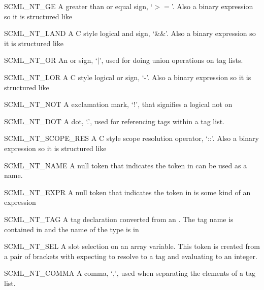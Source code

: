 \begin{cidentifierlist}
  \item[SCML_NT_GE]
  A greater than or equal sign, `$>=$'.  Also a binary expression so it is
  structured like 

  \item[SCML_NT_LAND]
  A C style logical and sign, `\&\&'.  Also a binary expression so it is
  structured like 

  \item[SCML_NT_OR]
  An or sign, `$|$', used for doing union operations on tag lists.

  \item[SCML_NT_LOR]
  A C style logical or sign, `-'.  Also a binary expression so it is structured
  like 

  \item[SCML_NT_NOT]
  A exclamation mark, `!', that signifies a logical not on

  \item[SCML_NT_DOT]
  A dot, `.', used for referencing tags within a tag list.

  \item[SCML_NT_SCOPE_RES]
  A C style scope resolution operator, `::'.  Also a binary expression so it is
  structured like 

  \item[SCML_NT_NAME]
  A null token that indicates the token in  can be
  used as a name.

  \item[SCML_NT_EXPR]
  A null token that indicates the token in  is some
  kind of an expression

  \item[SCML_NT_TAG]
  A tag declaration converted from an .  The tag
  name is contained in  and the name of the type is in

  \item[SCML_NT_SEL]
  A slot selection on an array variable.  This token is created from a pair of
  brackets with  expecting to resolve to a tag and
   evaluating to an integer.

  \item[SCML_NT_COMMA]
  A comma, `,', used when separating the elements of a tag list.


\end{cidentifierlist}
